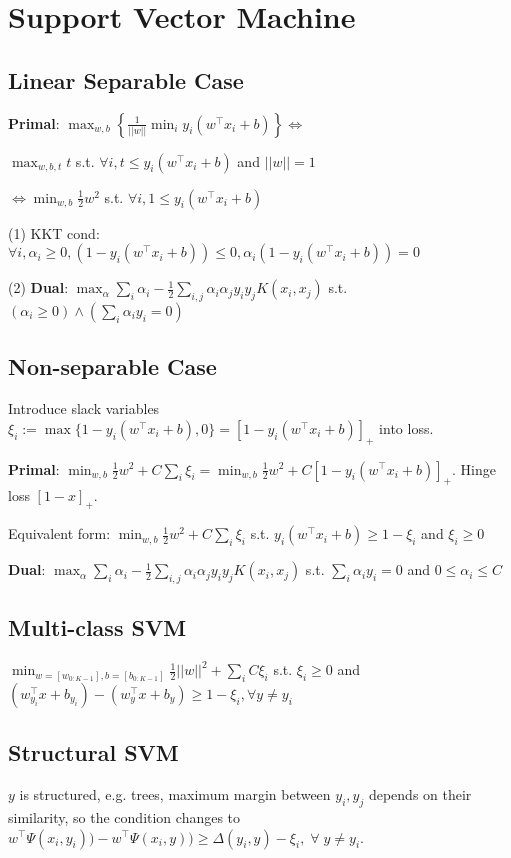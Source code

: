 \section{Support Vector Machine}
\subsection*{Linear Separable Case}
\textbf{Primal}: $\max_{w,b} \left\{\frac{1}{||w||} \min_{i}  y_{i}(w^{\top}x_{i}+b)\right\} \Leftrightarrow$

$\max_{w,b,t} t$ s.t. $\forall i,t\leq y_{i}(w^{\top}x_{i}+b)$ and $||w|| = 1$

$\Leftrightarrow \min_{w,b} \frac{1}{2} w^2$ s.t. $\forall i,1 \leq y_{i}(w^{\top}x_{i}+b)$ 

(1) KKT cond: $\forall i, \alpha_i \geq 0, (1-y_{i}(w^{\top}x_{i}+b))\leq 0, \alpha_{i}(1-y_{i}(w^{\top}x_{i}+b)) = 0$

(2) \textbf{Dual}: $\max_{\alpha} \sum_{i} \alpha_{i} - \frac{1}{2}\sum_{i,j}\alpha_{i} \alpha_{j} y_{i} y_{j} K(x_{i},x_{j})$ s.t. $(\alpha_i \geq 0)\land (\sum_{i} \alpha_{i} y_{i} = 0)$

\subsection*{Non-separable Case}
Introduce slack variables $\xi_i := \max \{1 - y_i(w^{\top}x_i + b), 0\} = [1 - y_i(w^{\top}x_i + b)]_{+}$ into loss. 

\textbf{Primal}: $\min_{w,b} \frac{1}{2} w^2 + C\sum_i\xi_i = \min_{w,b} \frac{1}{2} w^2 + C[1 - y_i(w^{\top}x_i + b)]_{+}$.  Hinge loss $[1-x]_{+}$.

Equivalent form: $\min_{w,b} \frac{1}{2} w^2 + C\sum_i\xi_i$ s.t. $ y_i(w^{\top}x_i + b) \geq 1-\xi_i$ and $\xi_i \geq 0$

\textbf{Dual}: $\max_{\alpha} \sum_{i} \alpha_{i} - \frac{1}{2}\sum_{i,j}\alpha_{i} \alpha_{j} y_{i} y_{j} K(x_i, x_j)$ s.t. $\sum_i \alpha_i y_i=0 $ and $0\leq \alpha_i \leq C$


\subsection*{Multi-class SVM}
$\min_{w=[w_{0:K-1}],b=[b_{0:K-1}]} \frac{1}{2} ||w||^2 + \sum_i C\xi_i$ s.t. $\xi_i\geq 0$ and $(w_{y_i}^{\top} x +b_{y_i}) - (w_{y}^{\top}x + b_{y}) \geq 1 -\xi_i, \forall y\neq y_i$

\subsection*{Structural SVM}
$y$ is structured, e.g. trees, maximum margin between $y_i,y_j$ depends on their similarity, so the condition changes to $w^{\top}\Psi(x_i,y_i)) - w^{\top}\Psi(x_i,y)) \geq \Delta(y_i,y) -\xi_i,\;\forall\;y\neq y_i$.

